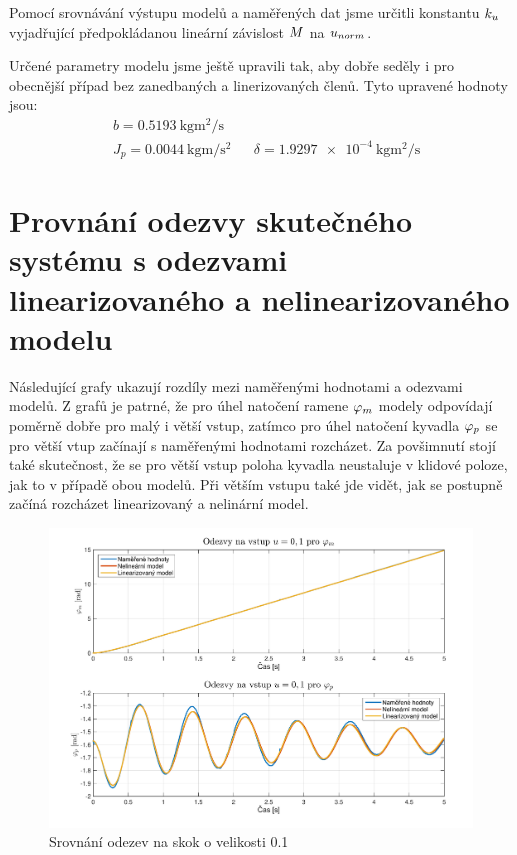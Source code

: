 \documentclass[11pt,a4paper]{article}
\begin{document}
 
Pomocí srovnávání výstupu modelů a naměřených dat jsme určitli konstantu $k_{u}$ vyjadřující předpokládanou lineární závislost $\M$ na $u_{norm}$.
 
Určené parametry modelu jsme ještě upravili tak, aby dobře seděly i pro obecnější případ bez zanedbaných a linerizovaných členů. Tyto upravené hodnoty jsou:
\begin{align*}
&b = \SI{0,5193}{\kilo \gram \meter \squared \per \second} \\
&J_p = \SI{0,0044}{\kilo \gram \metre \per \second \squared}	&&	\delta = \SI{1,9297e-4}{\kg \m \squared \per \second}
\end{align*}


\section{Provnání odezvy skutečného systému s odezvami linearizovaného a nelinearizovaného modelu}
Následující grafy ukazují rozdíly mezi naměřenými hodnotami a odezvami modelů. Z grafů je patrné, že pro úhel natočení ramene $\phin{m}$ modely odpovídají poměrně dobře pro malý i větší vstup, zatímco pro úhel natočení kyvadla $\phin{p}$ se pro větší vtup začínají s naměřenými hodnotami rozcházet. Za povšimnutí stojí také skutečnost, že se pro větší vstup poloha kyvadla neustaluje v klidové poloze, jak to v případě obou modelů. Při větším vstupu také jde vidět, jak se postupně začíná rozcházet linearizovaný a nelinární model.

\begin{figure}[H]
\centering
\includegraphics[scale=0.6]{Odezvy01.pdf}
\caption{Srovnání odezev na skok o velikosti 0.1}
\end{figure}
\end{document}
